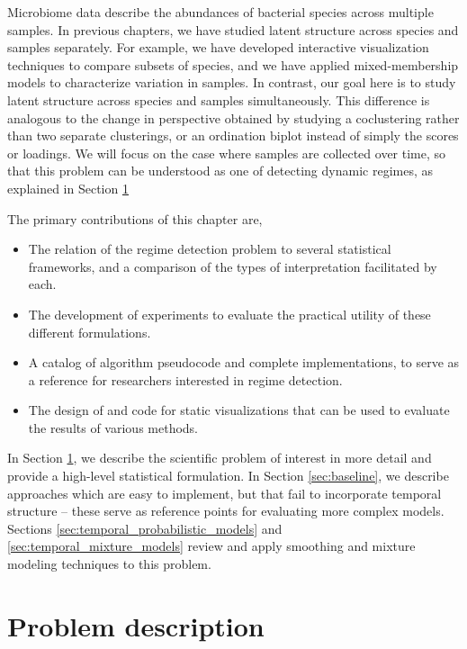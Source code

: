 \documentclass[14pt]{extreport}
\begin{document}
Microbiome data describe the abundances of bacterial species across multiple
samples. In previous chapters, we have studied latent structure across species
and samples separately. For example, we have developed interactive visualization
techniques to compare subsets of species, and we have applied mixed-membership
models to characterize variation in samples. In contrast, our goal here is to
study latent structure across species and samples simultaneously. This
difference is analogous to the change in perspective obtained by studying a
coclustering rather than two separate clusterings, or an ordination biplot
instead of simply the scores or loadings. We will focus on the case where
samples are collected over time, so that this problem can be understood as one
of detecting dynamic regimes, as explained in Section
\ref{sec:problem_description}

The primary contributions of this chapter are,
\begin{itemize}
\item The relation of the regime detection problem to several statistical
  frameworks, and a comparison of the types of interpretation facilitated by
  each.
\item The development of experiments to evaluate the practical utility of these
  different formulations.
\item A catalog of algorithm pseudocode and complete implementations, to serve as a
  reference for researchers interested in regime detection.
\item The design of and code for static visualizations that can be used to
  evaluate the results of various methods.
\end{itemize}

In Section \ref{sec:problem_description}, we describe the scientific problem of
interest in more detail and provide a high-level statistical formulation. In
Section \ref{sec:baseline}, we describe approaches which are easy to implement,
but that fail to incorporate temporal structure -- these serve as reference
points for evaluating more complex models. Sections
\ref{sec:temporal_probabilistic_models} and \ref{sec:temporal_mixture_models}
review and apply smoothing and mixture modeling techniques to this problem.

\section{Problem description}
\label{sec:problem_description}
\end{document}
